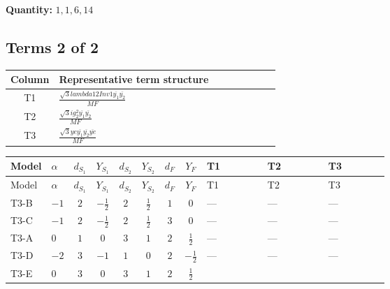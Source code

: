 \documentclass[8pt]{article}
\begin{document}
\begin{landscape}
\begin{longtable}{@{}llcccccc >{\raggedright\arraybackslash}p{0.21\linewidth} >{\raggedright\arraybackslash}p{0.21\linewidth} >{\raggedright\arraybackslash}p{0.21\linewidth}@{}}
\midrule
\bottomrule
\end{longtable}
\clearpage
\noindent\textbf{Quantity: }$\mathrm{1,1,6,14}$\par\smallskip
\subsection*{Terms 2 of 2}
\begin{center}
\begin{tabular}{@{}c >{\raggedright\arraybackslash}p{0.82\linewidth}@{}}
\toprule
Column & Representative term structure \\
\midrule
T1 & \(\displaystyle \frac{\sqrt{3} lambda12Inv1 \overline{y_{1}} \overline{y_{2}}}{MF}\) \\
\midrule
T2 & \(\displaystyle \frac{\sqrt{3} i g_{2}^{2} \overline{y_{1}} \overline{y_{2}}}{MF}\) \\
\midrule
T3 & \(\displaystyle \frac{\sqrt{3} ye \overline{y_{1}} \overline{y_{2}} \overline{ye}}{MF}\) \\
\midrule
\bottomrule
\end{tabular}
\end{center}
\smallskip
\tiny
\begin{longtable}{@{}llcccccc >{\raggedright\arraybackslash}p{0.21\linewidth} >{\raggedright\arraybackslash}p{0.21\linewidth} >{\raggedright\arraybackslash}p{0.21\linewidth}@{}}
\toprule
Model & $\alpha$ & $d_{S_1}$ & $Y_{S_1}$ & $d_{S_2}$ & $Y_{S_2}$ & $d_F$ & $Y_F$ & T1 & T2 & T3 \\
\midrule
\endfirsthead
\toprule
Model & $\alpha$ & $d_{S_1}$ & $Y_{S_1}$ & $d_{S_2}$ & $Y_{S_2}$ & $d_F$ & $Y_F$ & T1 & T2 & T3 \\
\midrule
\endhead
T3-B & $-1$ & $2$ & $-\frac{1}{2}$ & $2$ & $\frac{1}{2}$ & $1$ & $0$ & --- & --- & --- \\
\midrule
T3-C & $-1$ & $2$ & $-\frac{1}{2}$ & $2$ & $\frac{1}{2}$ & $3$ & $0$ & --- & --- & --- \\
\midrule
T3-A & $0$ & $1$ & $0$ & $3$ & $1$ & $2$ & $\frac{1}{2}$ & --- & --- & --- \\
\midrule
T3-D & $-2$ & $3$ & $-1$ & $1$ & $0$ & $2$ & $-\frac{1}{2}$ & --- & --- & --- \\
\midrule
T3-E & $0$ & $3$ & $0$ & $3$ & $1$ & $2$ & $\frac{1}{2}$ & \scriptsize\adjustbox{max width=\linewidth}{$\begin{gathered} \frac{\sqrt{3} lambda12Inv1 \overline{y_{1}} \overline{y_{2}}}{6 MF}\end{gathered}$} & \scriptsize\adjustbox{max width=\linewidth}{$\begin{gathered} - \frac{\sqrt{3} i g_{2}^{2} \overline{y_{1}} \overline{y_{2}}}{6 MF}\end{gathered}$} & \scriptsize\adjustbox{max width=\linewidth}{$\begin{gathered} \frac{\sqrt{3} ye \overline{y_{1}} \overline{y_{2}} \overline{ye}}{12 MF}\end{gathered}$} \\
\midrule
\bottomrule
\end{longtable}
\clearpage

\end{landscape}
\end{document}

